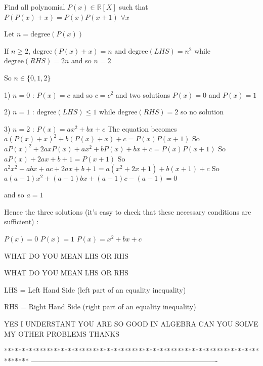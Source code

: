\begin{solution}
	\begin{tcolorbox}Find all polynomial $ P(x)\in\mathbb R[X]$ such that $ P(P(x)+x)=P(x)P(x+1)$ $ \forall x$\end{tcolorbox}

Let $ n=\text{degree}(P(x))$

If $ n\ge 2$, $ \text{degree}(P(x)+x)=n$ and $ \text{degree}(LHS)=n^2$ while $ \text{degree}(RHS)=2n$ and so $ n=2$

So $ n\in\{0,1,2\}$

1) $ n=0$ : $ P(x)=c$ and so $ c=c^2$ and two solutions $ P(x)=0$ and $ P(x)=1$

2) $ n=1$ : $ \text{degree}(LHS)\le 1$ while $ \text{degree}(RHS)=2$ so no solution

3) $ n=2$ : $ P(x)=ax^2+bx+c$ 
The equation becomes $ a(P(x)+x)^2+b(P(x)+x)+c=P(x)P(x+1)$
So $ aP(x)^2+2axP(x)+ax^2+bP(x)+bx+c=P(x)P(x+1)$
So $ aP(x)+2ax+b+1=P(x+1)$
So $ a^2x^2+abx+ac+2ax+b+1=a(x^2+2x+1)+b(x+1)+c$
So $ a(a-1)x^2+(a-1)bx+(a-1)c-(a-1)=0$

and so $ a=1$

Hence the three solutions (it's easy to check that these necessary conditions are sufficient) :

$ P(x)=0$
$ P(x)=1$
$ P(x)=x^2+bx+c$
\end{solution}



\begin{solution}
	WHAT DO YOU MEAN   LHS  OR RHS
\end{solution}



\begin{solution}
	\begin{tcolorbox}WHAT DO YOU MEAN   LHS  OR RHS\end{tcolorbox}

LHS = Left Hand Side (left part of an equality \/ inequality)

RHS = Right Hand Side (right part of an equality \/ inequality)
\end{solution}



\begin{solution}
	YES I UNDERSTANT YOU ARE SO GOOD IN ALGEBRA CAN YOU SOLVE MY OTHER PROBLEMS THANKS
\end{solution}
*******************************************************************************
-------------------------------------------------------------------------------

